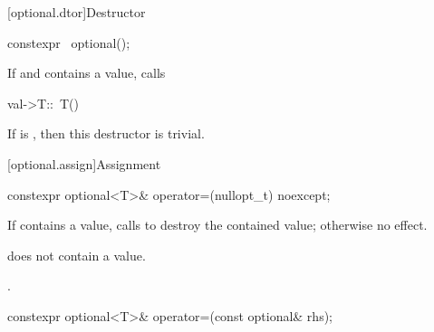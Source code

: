 [optional.dtor]{Destructor}

%
\begin{itemdecl}
constexpr ~optional();
\end{itemdecl}

\begin{itemdescr}
\pnum
\effects
If  and  contains a value, calls
\begin{codeblock}
val->T::~T()
\end{codeblock}

\pnum
\remarks
If  is , then this destructor is trivial.
\end{itemdescr}

[optional.assign]{Assignment}

%
\begin{itemdecl}
constexpr optional<T>& operator=(nullopt_t) noexcept;
\end{itemdecl}

\begin{itemdescr}
\pnum
\effects
If  contains a value, calls  to destroy the contained value; otherwise no effect.

\pnum
\ensures
{} does not contain a value.

\pnum
\returns
{}.
\end{itemdescr}

%
\begin{itemdecl}
constexpr optional<T>& operator=(const optional& rhs);
\end{itemdecl}

